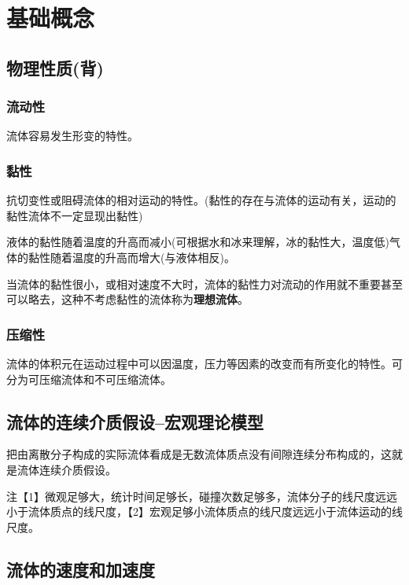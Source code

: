 \documentclass[a4paper,oneside]{ctexbook}
\begin{document}
\tableofcontents

\mainmatter

\chapter{基础概念}

\section{物理性质(背)}

\subsection{流动性}

流体容易发生形变的特性。

\subsection{黏性}

抗切变性或阻碍流体的相对运动的特性。(黏性的存在与流体的运动有关，运动的黏性流体不一定显现出黏性)

液体的黏性随着温度的升高而减小(可根据水和冰来理解，冰的黏性大，温度低)气体的黏性随着温度的升高而增大(与液体相反)。

当流体的黏性很小，或相对速度不大时，流体的黏性力对流动的作用就不重要甚至可以略去，这种不考虑黏性的流体称为\textbf{理想流体}。

\subsection{压缩性}

流体的体积元在运动过程中可以因温度，压力等因素的改变而有所变化的特性。可分为可压缩流体和不可压缩流体。

\section{流体的连续介质假设--宏观理论模型}

把由离散分子构成的实际流体看成是无数流体质点没有间隙连续分布构成的，这就是流体连续介质假设。

注【1】微观足够大，统计时间足够长，碰撞次数足够多，流体分子的线尺度远远小于流体质点的线尺度，【2】宏观足够小流体质点的线尺度远远小于流体运动的线尺度。

\section{流体的速度和加速度}
\end{document}
